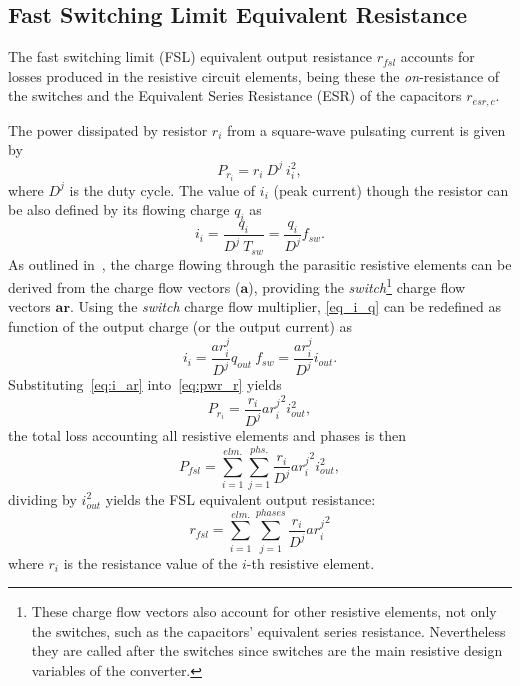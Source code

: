 \subsection[FSL Equivalent Resistance]{Fast Switching Limit Equivalent Resistance}
The fast switching limit (FSL) equivalent output resistance $r_{fsl}$ accounts for losses produced in the resistive circuit elements, being these the \emph{on}-resistance of the switches and the Equivalent Series Resistance (ESR) of the capacitors $r_{esr,c}$.

The power dissipated by resistor $r_i$  from a square-wave pulsating current is given by
\begin{equation}
P_{r_i} = r_i~D^j~i_i^2,
\label{eq:pwr_r}
\end{equation}
where $D^j$ is the duty cycle. The value of $i_i$ (peak current) though the resistor can be also defined by its flowing charge $q_i$ as
\begin{equation}
i_i = \frac{q_i}{D^j~T_{sw}} = \frac{q_i}{D^j} f_{sw}.
\label{eq:i_q}
\end{equation}
As outlined in~\cite{Seeman:EECS-2009-78}, the charge flowing through the parasitic resistive elements can be derived from the charge flow vectors ($\mathbf{a}$), providing the \emph{switch}\footnote{These charge flow vectors also account for other resistive elements, not only the switches, such as the capacitors' equivalent series resistance. Nevertheless they are called after the switches since switches are the main resistive design variables of the converter.} charge flow vectors $\mathbf{ar}$. Using the \emph{switch} charge flow multiplier, \eqref{eq_i_q} can be redefined as function of the output charge (or the output current) as
\begin{equation}
i_i = \frac{ar_i^j}{D^j} q_{out}~f_{sw} = \frac{ar_i^j}{D^j} i_{out}.
\label{eq:i_ar}
\end{equation}
Substituting~\eqref{eq:i_ar} into~\eqref{eq:pwr_r} yields
\begin{equation}
P_{r_i} = \frac{r_i}{D^j}{ar_i^j}^2 i_{out}^2 ,
\label{eq:pwr_r_ar}
\end{equation}
the total loss accounting all resistive elements and phases is then
\begin{equation}
P_{fsl} = \sum_{i=1}^{elm.} \sum_{j=1}^{phs.}  \frac{r_i}{D^j}{ar_i^j}^2 i_{out}^2,
\label{eq:pwr_fsl}
\end{equation}
dividing by $i_{out}^2$ yields the FSL equivalent output resistance:
\begin{equation}
r_{fsl}=\sum_{i=1}^{elm.}\sum_{j=1}^{phases}\frac{r_i}{D^j}{ar_i^j}^2
\label{eq:r_fsl}
\end{equation}
where $r_i$ is the resistance value of the $i$-th resistive element.


